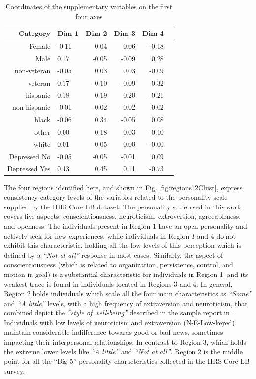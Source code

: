 \documentclass[conference]{IEEEtran}
\begin{document}
\begin{table}[ht]
\caption{Coordinates of the supplementary variables on the first four axes} 
\centering
\begin{tabular}{rlrrrr}
  \hline
  Category & Dim 1 & Dim 2 & Dim 3 & Dim 4 \\ 
  \hline
  \hline
  Female & -0.11 & 0.04 & 0.06 & -0.18 \\ 
  Male & 0.17 & -0.05 & -0.09 & 0.28 \\ 
  \hline
  non-veteran & -0.05 & 0.03 & 0.03 & -0.09 \\ 
  veteran & 0.17 & -0.10 & -0.09 & 0.32 \\ 
  \hline
  hispanic & 0.18 & 0.19 & 0.20 & -0.21 \\ 
  non-hispanic & -0.01 & -0.02 & -0.02 & 0.02 \\ 
  \hline
  black & -0.06 & 0.34 & -0.05 & 0.08 \\ 
  other & 0.00 & 0.18 & 0.03 & -0.10 \\ 
  white & 0.01 & -0.05 & 0.00 & -0.00 \\ 
  \hline
  Depressed No & -0.05 & -0.05 & -0.01 & 0.09 \\ 
  Depressed Yes & 0.43 & 0.45 & 0.11 & -0.73 \\ 
   \hline
\end{tabular}
\label{tab:supplCoord}
\end{table}

The four regions identified here, and shown in Fig.
\ref{fig:regions12Clust}, express consistency category levels of the
variables related to the personality scale \cite{lachman1997midlife}
supplied by the HRS Core LB dataset. The personality scale used in this
work covers five aspects: conscientiousness, neuroticism, extroversion,
agreeableness, and openness. The individuals present in Region 1 have an
open personality and actively seek for new experiences, while
individuals in Region 3 and 4 do not exhibit this characteristic,
holding all the low levels of this perception which is defined by a
\emph{``Not at all''} response in most cases. Similarly, the aspect of
conscientiousness (which is related to organization, persistence,
control, and motion in goal) is a substantial characteristic for
individuals in Region 1, and its weakest trace is found in individuals
located in Regions 3 and 4. In general, Region 2 holds individuals which
scale all the four main characteristics as \emph{``Some''} and \emph{``A
little''} levels, with a high frequency of extraversion and neuroticism,
that combined depict the \emph{``style of well-being''} described in the
sample report in \cite{costa_nodate}. Individuals with low levels of
neuroticism and extraversion (N-E-Low-keyed) maintain considerable
indifference towards good or bad news, sometimes impacting their
interpersonal relationships. In contrast to Region 3, which holds the
extreme lower levels like \emph{``A little''} and \emph{``Not at all''}.
Region 2 is the middle point for all the ``Big 5'' personality
characteristics collected in the HRS Core LB survey.
\end{document}
